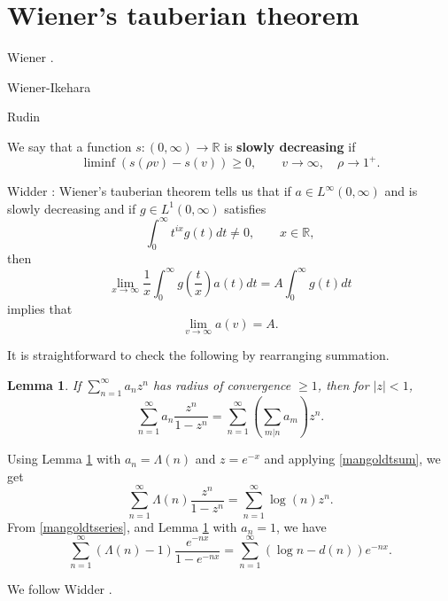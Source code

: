\documentclass{article}
\newtheorem{lemma}[theorem]{Lemma}
\begin{document}
\section{Wiener's tauberian theorem}
Wiener \cite[Chapter~III]{wiener}.

Wiener-Ikehara \cite{chandrasekharan148}

Rudin \cite[p.~229, Theorem 9.7]{rudin}

We say that a function $s:(0,\infty) \to \mathbb{R}$ is \textbf{slowly decreasing} if 
\[
\liminf (s(\rho v)-s(v)) \geq 0, \qquad v \to \infty, \quad \rho \to 1^+.
\]

Widder \cite[p.~211, Theorem 10b]{widder}: Wiener's tauberian theorem tells us that if
$a \in L^\infty(0,\infty)$ and is slowly decreasing and if $g \in L^1(0,\infty)$ satisfies
\[
\int_0^\infty t^{ix} g(t) dt \neq 0, \qquad x \in \mathbb{R},
\]
then
\[
\lim_{x \to \infty} \frac{1}{x} \int_0^\infty g\left(\frac{t}{x}\right) a(t) dt = A \int_0^\infty g(t) dt
\]
implies that
\[
\lim_{v \to \infty} a(v) = A.
\]





It is straightforward to check the following by rearranging summation.

\begin{lemma}
If $\sum_{n=1}^\infty a_n z^n$ has radius of convergence $\geq 1$, then for $|z|<1$,
\[
\sum_{n=1}^\infty a_n \frac{z^n}{1-z^n} = \sum_{n=1}^\infty \left( \sum_{m | n} a_m\right) z^n.
\]
\label{rearrangement}
\end{lemma}

Using Lemma \ref{rearrangement} with $a_n=\Lambda(n)$ and $z=e^{-x}$ and applying \eqref{mangoldtsum}, we get
\begin{equation}
\sum_{n=1}^\infty \Lambda(n) \frac{z^n}{1-z^n} = \sum_{n=1}^\infty \log(n) z^n.
\label{mangoldtseries}
\end{equation}
From \eqref{mangoldtseries}, and Lemma \ref{rearrangement} with $a_n=1$, we have
\[
\sum_{n=1}^\infty (\Lambda(n)-1) \frac{e^{-nx}}{1-e^{-nx}}
=\sum_{n=1}^\infty (\log n  - d(n)) e^{-nx}.
\]

We follow
Widder \cite[p.~231, Theorem 16.6]{widder}.
\end{document}
